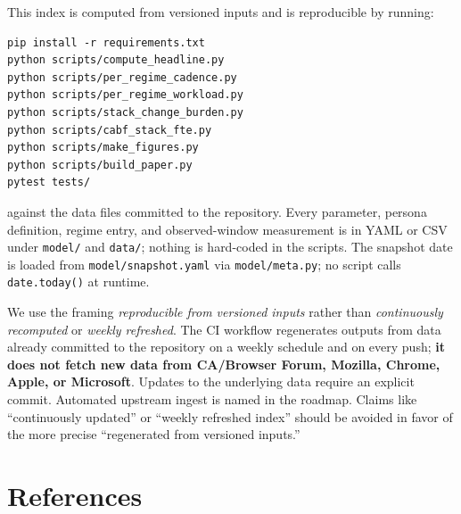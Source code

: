 \documentclass[11pt,letterpaper]{article}
\begin{document}
This index is computed from versioned inputs and is reproducible by running:

\begin{verbatim}
pip install -r requirements.txt
python scripts/compute_headline.py
python scripts/per_regime_cadence.py
python scripts/per_regime_workload.py
python scripts/stack_change_burden.py
python scripts/cabf_stack_fte.py
python scripts/make_figures.py
python scripts/build_paper.py
pytest tests/
\end{verbatim}

against the data files committed to the repository. Every parameter, persona definition, regime entry, and observed-window measurement is in YAML or CSV under \texttt{model/} and \texttt{data/}; nothing is hard-coded in the scripts. The snapshot date is loaded from \texttt{model/snapshot.yaml} via \texttt{model/meta.py}; no script calls \texttt{date.today()} at runtime.

We use the framing \textit{reproducible from versioned inputs} rather than \textit{continuously recomputed} or \textit{weekly refreshed}. The CI workflow regenerates outputs from data already committed to the repository on a weekly schedule and on every push; \textbf{it does not fetch new data from CA/Browser Forum, Mozilla, Chrome, Apple, or Microsoft}. Updates to the underlying data require an explicit commit. Automated upstream ingest is named in the roadmap. Claims like ``continuously updated'' or ``weekly refreshed index'' should be avoided in favor of the more precise ``regenerated from versioned inputs.''

\section*{References}
\end{document}

